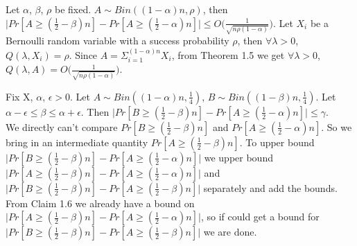 \documentclass[11pt]{article}
\begin{document}
\BCM
Let $\alpha$, $\beta$, $\rho$ be fixed. $A \sim Bin((1-\alpha)n, \rho)$, then $\big| Pr[A \geq (\frac{1}{2} - \beta)n] - Pr[A \geq (\frac{1}{2} - \alpha)n] \big| \leq O\Big(\frac{1}{\sqrt{n\rho(1-\alpha)}}\Big)$.
\ECM
\BPF
Let $X_i$ be a Bernoulli random variable with a success probability $\rho$, then $\forall \lambda > 0$, $Q(\lambda, X_i)= \rho$. Since $A = \Sigma_{i = 1}^{(1-\alpha)n} X_i$, from Theorem 1.5 we get $ \forall\lambda>0$, $Q(\lambda, A) = O\Big(\frac{1}{\sqrt{n\rho(1-\alpha)}}\Big)$.
\EPF


\BCM
Fix X, $\alpha$, $\epsilon > 0$. Let $A \sim Bin((1-\alpha)n, \frac{1}{4})$, $B \sim Bin((1-\beta)n, \frac{1}{4})$. Let $\alpha - \epsilon \leq \beta \leq \alpha + \epsilon$. Then $\big| Pr[B \geq (\frac{1}{2} - \beta)n] - Pr[A \geq (\frac{1}{2} - \alpha)n] \big| \leq \gamma$.
\ECM
\BPF
\\ \noindent
We directly can't compare $Pr[B \geq (\frac{1}{2} - \beta)n]$ and $Pr[A \geq (\frac{1}{2} - \alpha)n]$. So we bring in an intermediate quantity $Pr[A \geq (\frac{1}{2} - \beta)n]$. To upper bound $\big| Pr[B \geq (\frac{1}{2} - \beta)n] - Pr[A \geq (\frac{1}{2} - \alpha)n] \big|$ we upper bound $\big| Pr[A \geq (\frac{1}{2} - \beta)n] - Pr[A \geq (\frac{1}{2} - \alpha)n] \big|$ and $\big| Pr[B \geq (\frac{1}{2} - \beta)n] - Pr[A \geq (\frac{1}{2} - \beta)n] \big|$ separately and add the bounds. From Claim 1.6 we already have a bound on $\big| Pr[A \geq (\frac{1}{2} - \beta)n] - Pr[A \geq (\frac{1}{2} - \alpha)n] \big|$, so if could get a bound for $\big| Pr[B \geq (\frac{1}{2} - \beta)n] - Pr[A \geq (\frac{1}{2} - \beta)n] \big|$ we are done.


\EPF

 
\fi 



\end{document}
